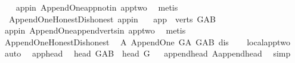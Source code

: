 \begin{isabellebody}
%
\isadelimproof
\ \ %
\endisadelimproof
%
\isatagproof
{}\isamarkupfalse%
\ app{\isacharunderscore}{\kern0pt}in\ Append{\isacharunderscore}{\kern0pt}One{\isachardot}{\kern0pt}app{\isacharunderscore}{\kern0pt}notin\ app{\isacharunderscore}{\kern0pt}two\ \isamarkupfalse%
\ metis%
\endisatagproof
{\isafoldproof}%
%
\isadelimproof
\isanewline
%
\endisadelimproof
\isanewline
\isanewline
{}\isamarkupfalse%
\ {\isacharparenleft}{\kern0pt}\ Append{\isacharunderscore}{\kern0pt}One{\isacharunderscore}{\kern0pt}Honest{\isacharunderscore}{\kern0pt}Dishonest{\isacharparenright}{\kern0pt}\ app{\isacharunderscore}{\kern0pt}in{}{\isacharcolon}{\kern0pt}\ \isanewline
\ \ {\isachardoublequoteopen}app\ {\isasymin}\ verts\ G{\isacharunderscore}{\kern0pt}AB{\isachardoublequoteclose}\ \isanewline
%
\isadelimproof
\ \ %
\endisadelimproof
%
\isatagproof
{}\isamarkupfalse%
\ app{\isacharunderscore}{\kern0pt}in\ Append{\isacharunderscore}{\kern0pt}One{\isachardot}{\kern0pt}append{\isacharunderscore}{\kern0pt}verts{\isacharunderscore}{\kern0pt}in\ app{\isacharunderscore}{\kern0pt}two\ \isamarkupfalse%
\ metis%
\endisatagproof
{\isafoldproof}%
%
\isadelimproof
\isanewline
%
\endisadelimproof
\isanewline
{}\isamarkupfalse%
\ Append{\isacharunderscore}{\kern0pt}One{\isacharunderscore}{\kern0pt}Honest{\isacharunderscore}{\kern0pt}Dishonest\ \isanewline
\isanewline
{}\isanewline
{}\isamarkupfalse%
\ A{}{\isacharcolon}{\kern0pt}\ Append{\isacharunderscore}{\kern0pt}One\ G{\isacharunderscore}{\kern0pt}A\ G{\isacharunderscore}{\kern0pt}AB\ dis%
\isadelimproof
\ \ %
\endisadelimproof
%
\isatagproof
{}\isamarkupfalse%
\ local{\isachardot}{\kern0pt}app{\isacharunderscore}{\kern0pt}two\ \isamarkupfalse%
\ auto%
\endisatagproof
{\isafoldproof}%
%
\isadelimproof
%
\endisadelimproof
\isanewline
\isanewline
\isanewline
{}\isamarkupfalse%
\ \ app{}{\isacharunderscore}{\kern0pt}head{\isacharcolon}{\kern0pt}\isanewline
\ \ {\isachardoublequoteopen}head\ G{\isacharunderscore}{\kern0pt}AB\ {\isacharequal}{\kern0pt}\ head\ G{\isachardoublequoteclose}%
\isadelimproof
\ %
\endisadelimproof
%
\isatagproof
{}\isamarkupfalse%
\ append{\isacharunderscore}{\kern0pt}head\ A{}{\isachardot}{\kern0pt}append{\isacharunderscore}{\kern0pt}head\ \isamarkupfalse%
\ simp%
\endisatagproof
{\isafoldproof}%
%
\isadelimproof
%
\endisadelimproof
\isanewline

\end{isabellebody}
